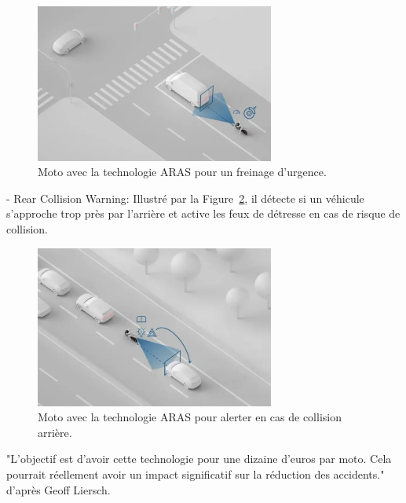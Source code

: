 \begin{figure}[H]
    \centering
    \includegraphics[width=0.7\textwidth]{images/ktm_detecteur_dev.png} 
    \caption{Moto avec la technologie ARAS pour un freinage d'urgence.}
    \label{detecteuravant}
\end{figure}
- Rear Collision Warning: Illustré par la Figure~\ref{detecteurarriere}, il détecte si un véhicule s'approche trop près par l'arrière et active les feux de détresse en cas de risque de collision. 
\begin{figure}[H]
    \centering
    \includegraphics[width=0.7\textwidth]{images/ktm_detecteur.png} 
    \caption{Moto avec la technologie ARAS pour alerter en cas de collision arrière.}
    \label{detecteurarriere}
\end{figure}

"L'objectif est d'avoir cette technologie pour une dizaine d'euros par moto. Cela pourrait réellement avoir un impact significatif sur la réduction des accidents." d'après Geoff Liersch.\\

